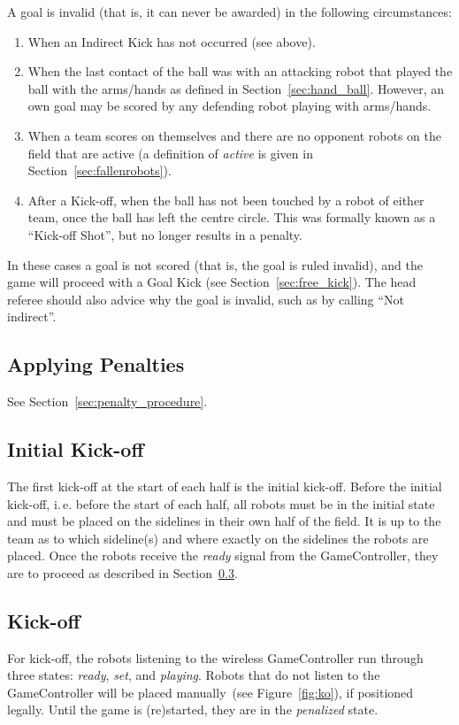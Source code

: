 \documentclass[12pt]{article}
\newcommand{\ie}{\mbox{i.\,e.}\xspace}
\newcommand{\cf}{see\xspace}
\begin{document}
A goal is invalid (that is, it can never be awarded) in the following circumstances:
\begin{enumerate}
    \item When an Indirect Kick has not occurred (see above).
    \item When the last contact of the ball was with an attacking robot that played the ball with the arms/hands as defined in Section~\ref{sec:hand_ball}. However, an own goal may be scored by any defending robot playing with arms/hands.
    \item When a team scores on themselves and there are no opponent robots on the field that are active (a definition of \emph{active} is given in Section~\ref{sec:fallenrobots}).
    \item After a Kick-off, when the ball has not been touched by a robot of either team, once the ball has left the centre circle. This was formally known as a ``Kick-off Shot'', but no longer results in a penalty.
\end{enumerate}

In these cases a goal is not scored (that is, the goal is ruled invalid), and the game will proceed with a Goal Kick (\cf Section~\ref{sec:free_kick}). The head referee should also advice why the goal is invalid, such as by calling ``Not indirect''.

\subsection{Applying Penalties}

See Section~\ref{sec:penalty_procedure}.


\subsection{Initial Kick-off}
\label{sec:initial-kick-off}

The first kick-off at the start of each half is the initial kick-off.
Before the initial kick-off, \ie before the start of each half, all robots must be in the initial state and must be placed on the sidelines in their own half of the field.
It is up to the team as to which sideline(s) and where exactly on the sidelines the robots are placed.
Once the robots receive the \emph{ready} signal from the GameController, they are to proceed as described in Section~\ref{sec:kick-off}.


\subsection{Kick-off}
\label{sec:kick-off}
For kick-off, the robots listening to the wireless GameController run through three states: \emph{ready}, \emph{set}, and \emph{playing}.
Robots that do not listen to the GameController will be placed manually~(see Figure~\ref{fig:ko}), if positioned legally.
Until the game is (re)started, they are in the \emph{penalized} state.
\end{document}
